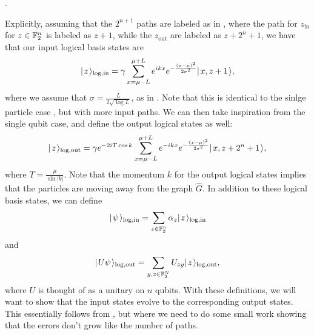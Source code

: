 \documentclass[../thesis-main/thesis-main]{subfiles}
\begin{document}
.


Explicitly, assuming that the $2^{n+1}$ paths are labeled as in , where the path for $z_{\text{in}}$ for $z\in \mathbb{F}_2^n$ is labeled as $z+1$, while the $z_{\text{out}}$ are labeled as $z+2^n+1$, we have that our input logical basis states are
\begin{align}
  |\mspace{2mu} z \mspace{2mu} \rangle_{\text{log},\text{in}} = \gamma \sum_{x = \mu - L}^{\mu + L} e^{ i k x} e^{ - \frac{(x-\mu)^2}{2\sigma^2}} |\mspace{2mu} x,z+1 \mspace{2mu} \rangle,
  \label{eq:multi_qubit_input_encoding}
\end{align}
where we assume that $\sigma = \frac{L}{2\sqrt{\log L}}$, as in .  Note that this is identical to the sinlge particle case , but with more input paths.  We can then take inspiration from the single qubit case, and define the output logical states as well:
 \begin{align}
  |\mspace{2mu} z \mspace{2mu} \rangle_{\text{log},\text{out}} = \gamma e^{- 2 i T \cos k} \sum_{x = \mu - L}^{\mu + L} e^{ -i k x} e^{ - \frac{(x-\mu)^2}{2\sigma^2}} |\mspace{2mu} x,z+2^n + 1 \mspace{2mu} \rangle,
  \label{eq:multi_qubit_output_encoding}
\end{align}
where $T = \frac{\mu}{\sin |k|}$.  Note that the momentum $k$ for the output logical states implies that the particles are moving away from the graph $\widehat{G}$.  In addition to these logical basis states, we can define
\begin{align}
  |\mspace{2mu} \psi \mspace{2mu} \rangle_{\text{log},\text{in}} = \sum_{z\in \mathbb{F}_2^n} \alpha_z |\mspace{2mu} z \mspace{2mu} \rangle_{\text{log},\text{in}}
\end{align} 
and
\begin{align}
  |\mspace{2mu} U \psi \mspace{2mu} \rangle_{\text{log},\text{out}} = \sum_{y,z\in\mathbb{F}_2^N} U_{zy}|\mspace{2mu} z \mspace{2mu} \rangle_{\text{log},\text{out}},
\end{align}
where $U$ is thought of as a unitary on $n$ qubits.  With these definitions, we will want to show that the input states evolve to the corresponding output states.  This essentially follows from , but where we need to do some small work showing that the errors don't grow like the number of paths.
\end{document}
